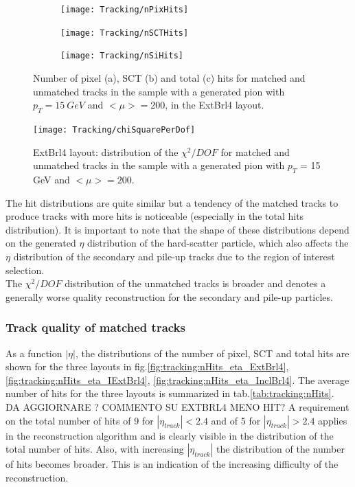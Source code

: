 \documentclass[a4paper,twoside,12pt]{article}
\begin{document}
\begin{figure}
\begin{subfigure}{\linewidth}
\centering
\texttt{[image: Tracking/nPixHits]}
\caption{}
\label{fig:tracking:nPixHits}
\end{subfigure}

\begin{subfigure}{\linewidth}
\centering
\texttt{[image: Tracking/nSCTHits]}
\caption{}
\label{fig:tracking:nSCTHits}
\end{subfigure}

\begin{subfigure}{\linewidth}
\centering
\texttt{[image: Tracking/nSiHits]}
\caption{}
\label{fig:tracking:nSiHits}
\end{subfigure}
\caption{Number of pixel (a), SCT (b) and total (c) hits for matched and unmatched tracks in the sample with a generated pion with $p_{T} = 15\ GeV$ and $<\mu> = 200$, in the ExtBrl4 layout.}
\label{fig:tracking:nHits}
\end{figure}

\begin{figure}
\centering
\texttt{[image: Tracking/chiSquarePerDof]}
\caption{ExtBrl4 layout: distribution of the $\chi^2/DOF$ for matched and unmatched tracks in the sample with a generated pion with $p_{T}$ = 15 GeV and $<\mu> = 200$.}
\label{fig:tracking:chiSquare}
\end{figure}

The hit distributions are quite similar but a tendency of the matched tracks to produce tracks with more hits is noticeable (especially in the total hits distribution). It is important to note that the shape of these distributions depend on the generated $\eta$ distribution of the hard-scatter particle, which
also affects the $\eta$ distribution of the secondary and pile-up tracks due to the region of interest selection. \\

The $\chi^2/DOF$ distribution of the unmatched tracks is broader and denotes a generally worse quality reconstruction for the secondary 
and pile-up particles. \\

\subsubsection{Track quality of matched tracks}
As a function $|\eta|$, the distributions of the number of pixel, SCT and total hits are shown for the three layouts in fig.\ref{fig:tracking:nHits_eta_ExtBrl4},
 \ref{fig:tracking:nHits_eta_IExtBrl4}, \ref{fig:tracking:nHits_eta_InclBrl4}. The average number of hits for the three layouts is summarized in tab.\ref{tab:tracking:nHits}. DA AGGIORNARE ? COMMENTO SU EXTBRL4 MENO HIT? A requirement on the total number of hits of 9 for $|\eta_{track}| < 2.4$ and of 5 for $|\eta_{track}| > 2.4$ applies in the reconstruction algorithm
 and is clearly visible in the distribution of the total number of hits. Also, with increasing $|\eta_{track}|$ the distribution of the number of hits becomes broader. This is an indication of the increasing
 difficulty of the reconstruction.  \\
\end{document}
